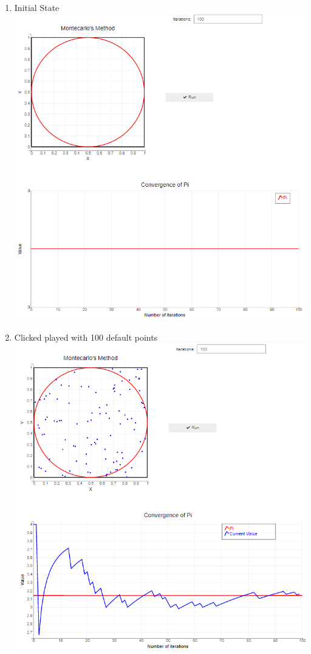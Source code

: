 \begin{enumerate}
    \item Initial State\\
    \includegraphics[scale=0.7]{Include/Images/Thesis/Documentation/Visualizers/Randomness/Example 1/Example 1 - 00 - Initial State.png}
    \item Clicked played with 100 default points\\
    \includegraphics[scale=0.7]{Include/Images/Thesis/Documentation/Visualizers/Randomness/Example 1/Example 1 - 01 - Clicked PLayed.png}

\end{enumerate}
